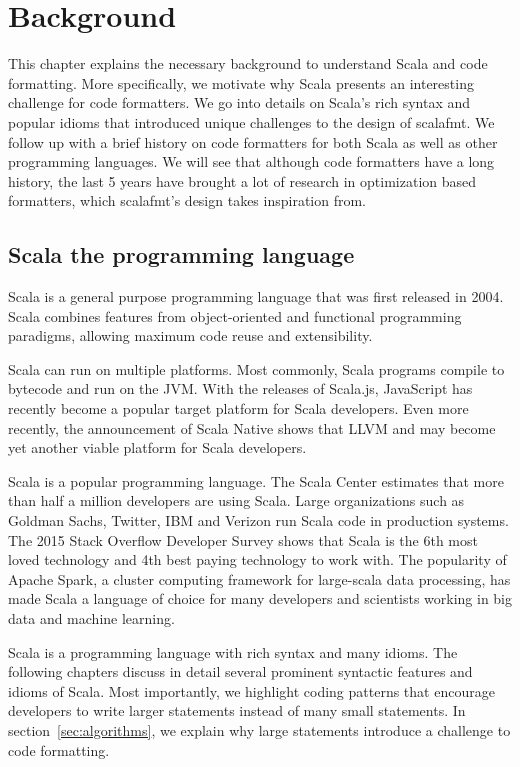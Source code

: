 \section{Background}
This chapter explains the necessary background to understand Scala and code formatting.
More specifically, we motivate why Scala presents an interesting challenge for code formatters.
We go into details on Scala's rich syntax and popular idioms that introduced unique challenges to the design of scalafmt.
We follow up with a brief history on code formatters for both Scala as well as other programming languages.
We will see that although code formatters have a long history, the last 5 years have brought a lot of research in optimization based formatters, which scalafmt's design takes inspiration from.

\subsection{Scala the programming language}
Scala\autocite{odersky_scala_2004} is a general purpose programming language that was first released in 2004.
Scala combines features from object-oriented and functional programming paradigms, allowing maximum code reuse and extensibility.

Scala can run on multiple platforms.
Most commonly, Scala programs compile to bytecode and run on the JVM.
With the releases of Scala.js\autocite{doeraene_scala.js_2015}, JavaScript has recently become a popular target platform for Scala developers.
Even more recently, the announcement of Scala Native\autocite{_scala-native/scala-native_????} shows that LLVM and may become yet another viable platform for Scala developers.

Scala is a popular programming language.
The Scala Center estimates that more than half a million developers are using Scala\autocite{odersky_scala_2016}.
Large organizations such as Goldman Sachs, Twitter, IBM and Verizon run Scala code in production systems.
The 2015 Stack Overflow Developer Survey shows that Scala is the 6th most loved technology and 4th best paying technology to work with\autocite{_stack_????}.
The popularity of Apache Spark\autocite{_apache_????-1}, a cluster computing framework for large-scala data processing, has made Scala a language of choice for many developers and scientists working in big data and machine learning.

Scala is a programming language with rich syntax and many idioms.
The following chapters discuss in detail several prominent syntactic features and idioms of Scala.
Most importantly, we highlight coding patterns that encourage developers to write larger statements instead of many small statements.
In section~\ref{sec:algorithms}, we explain why large statements introduce a challenge to code formatting.

